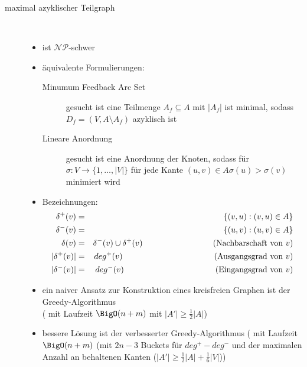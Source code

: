\begin{description}
	\item[maximal azyklischer Teilgraph] \ \\\vspace*{-\baselineskip}
		\begin{itemize}
			\item ist $\mathcal{NP}$-schwer
			\item äquivalente Formulierungen:
				\begin{description}
					\item[Minumum Feedback Arc Set] gesucht ist eine Teilmenge $A_f\subseteq A$ mit $|A_f|$ ist minimal, sodass $D_f=(V,A\setminus A_f)$ azyklisch ist
					\item[Lineare Anordnung] gesucht ist eine Anordnung der Knoten, sodass für $\sigma : V\rightarrow \{1,\dots,|V|\}$ für jede Kante $(u,v)\in A \sigma(u)>\sigma(v)$ minimiert wird\\
					
				\end{description}
			\item Bezeichnungen:
				\begin{eqnarray*}
					\delta^{+}(v)&=&\{(v,u) : (v,u)\in A\}\\
					\delta^{-}(v)&=&\{(u,v) : (u,v)\in A\}\\
					\delta(v)&=&\delta^{-}(v)\cup \delta^{+}(v)\hspace*{3cm}\text{(Nachbarschaft von $v$)}\\
					|\delta^{+}(v)| &=& deg^{+}(v)\hspace*{3.9cm}\text{(Ausgangsgrad von $v$)}\\
					|\delta^{-}(v)| &=& deg^{-}(v)\hspace*{3.9cm}\text{(Eingangsgrad von $v$)}\\
				\end{eqnarray*}
			\item ein naiver Ansatz zur Konstruktion eines kreisfreien Graphen ist der Greedy-Algorithmus\\ (\algobreak{} mit Laufzeit $\BigO(n+m)$ mit $|A'|\geq \frac{1}{2}|A|$)
			\item bessere Lösung ist der verbesserter Greedy-Algorithmus ( mit Laufzeit $\BigO(n+m)$ (mit $2n-3$ Buckets für $deg^{+}-deg^{-}$ und der maximalen Anzahl an behaltenen Kanten ($|A'|\geq \frac{1}{2}|A|+\frac{1}{6}|V|$))
		\end{itemize}
\end{description}